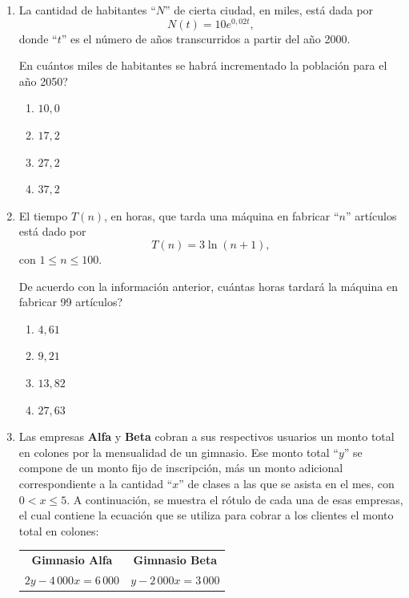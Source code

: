 \documentclass[11pt]{article}
\newcommand{\opcion}[2]{\item $#2$}
\begin{document}
\begin{enumerate}[label=\textbf{\arabic*.}, itemsep=2.5cm]
\Needspace{0.45\textheight}
\item
La cantidad de habitantes ``$N$'' de cierta ciudad, en miles, est\'a dada por
\[N(t) = 10e^{0{,}02t},\]
donde ``$t$'' es el n\'umero de a\~nos transcurridos a partir del a\~no 2000.

\textquestiondown En cu\'antos miles de habitantes se habr\'a incrementado la poblaci\'on para el a\~no 2050?

\begin{enumerate}[label=\Alph*)]
  \item $10{,}0$
  \opcion{B}{17{,}2}
  \item $27{,}2$
  \item $37{,}2$
\end{enumerate}

\Needspace{0.42\textheight}
\item
El tiempo $T(n)$, en horas, que tarda una m\'aquina en fabricar ``$n$'' art\'iculos est\'a dado por
\[T(n) = 3\ln(n+1),\]
con $1 \leq n \leq 100$.

De acuerdo con la informaci\'on anterior, \textquestiondown cu\'antas horas tardar\'a la m\'aquina en fabricar 99 art\'iculos?

\begin{enumerate}[label=\Alph*)]
  \item $4{,}61$
  \item $9{,}21$
  \opcion{C}{13{,}82}
  \item $27{,}63$
\end{enumerate}


\Needspace{0.45\textheight}
\item
Las empresas \textbf{Alfa} y \textbf{Beta} cobran a sus respectivos usuarios un monto total en colones por la mensualidad de un gimnasio. Ese monto total ``$y$'' se compone de un monto fijo de inscripci\'on, m\'as un monto adicional correspondiente a la cantidad ``$x$'' de clases a las que se asista en el mes, con $0 < x \leq 5$. A continuaci\'on, se muestra el r\'otulo de cada una de esas empresas, el cual contiene la ecuaci\'on que se utiliza para cobrar a los clientes el monto total en colones:

\begin{center}
\begin{tabular}{cc}
\textbf{Gimnasio Alfa} & \hspace{2cm}\textbf{Gimnasio Beta} \\[6pt]
$2y - 4\,000x = 6\,000$ & \hspace{2cm}$y - 2\,000x = 3\,000$
\end{tabular}
\end{center}


\end{enumerate}
\end{document}
